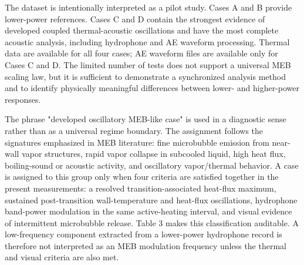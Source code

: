 \documentclass[final,1p,times]{elsarticle}
\begin{document}
The dataset is intentionally interpreted as a pilot study. Cases A and B provide lower-power references. Cases C and D contain the strongest evidence of developed coupled thermal-acoustic oscillations and have the most complete acoustic analysis, including hydrophone and AE waveform processing. Thermal data are available for all four cases; AE waveform files are available only for Cases C and D. The limited number of tests does not support a universal MEB scaling law, but it is sufficient to demonstrate a synchronized analysis method and to identify physically meaningful differences between lower- and higher-power responses.

\begin{table}[t]
  \centering
  \caption{Data coverage and interpretation scope for each case.}
\end{table}

The phrase "developed oscillatory MEB-like case" is used in a diagnostic sense rather than as a universal regime boundary. The assignment follows the signatures emphasized in MEB literature: fine microbubble emission from near-wall vapor structures, rapid vapor collapse in subcooled liquid, high heat flux, boiling-sound or acoustic activity, and oscillatory vapor/thermal behavior. A case is assigned to this group only when four criteria are satisfied together in the present measurements: a resolved transition-associated heat-flux maximum, sustained post-transition wall-temperature and heat-flux oscillations, hydrophone band-power modulation in the same active-heating interval, and visual evidence of intermittent microbubble release. Table 3 makes this classification auditable. A low-frequency component extracted from a lower-power hydrophone record is therefore not interpreted as an MEB modulation frequency unless the thermal and visual criteria are also met.
\end{document}
